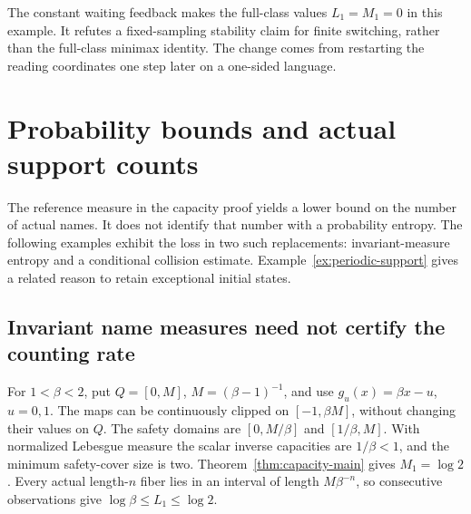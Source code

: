 \documentclass[11pt,reqno]{amsart}
\numberwithin{equation}{section}
\theoremstyle{definition}
\theoremstyle{definition}
\begin{document}
The constant waiting feedback makes the full-class values
$L_1=M_1=0$ in this example. It refutes a fixed-sampling
stability claim for finite switching, rather than the full-class
minimax identity. The change comes from restarting the reading
coordinates one step later on a one-sided language.


\section{Probability bounds and actual support counts}
\label{app:capacity-boundaries}

The reference measure in the capacity proof yields a lower bound on
the number of actual names. It does not identify that number with a
probability entropy. The following examples exhibit the loss in two
such replacements: invariant-measure entropy and a conditional
collision estimate. Example~\ref{ex:periodic-support} gives a related
reason to retain exceptional initial states.

\subsection{Invariant name measures need not certify the counting rate}

For $1<\beta<2$, put $Q=[0,M]$, $M=(\beta-1)^{-1}$, and use
$g_u(x)=\beta x-u$, $u=0,1$. The maps can be continuously clipped
on $[-1,\beta M]$, without changing their values on $Q$.
The safety domains are $[0,M/\beta]$ and $[1/\beta,M]$.
With normalized Lebesgue measure the scalar inverse capacities
are $1/\beta<1$, and the minimum safety-cover size is two.
Theorem~\ref{thm:capacity-main} gives $M_1=\log2$.
Every actual length-$n$ fiber lies in an interval of length
$M\beta^{-n}$, so consecutive observations give
$\log\beta\le L_1\le\log2$.
\end{document}
